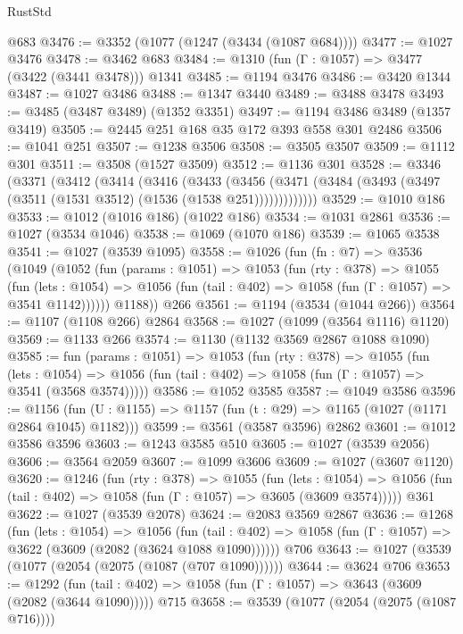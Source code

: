 \begin{lexlean}{RustStd}
\begin{coremodule}
    @683
@3476 := @3352 (@1077 (@1247 (@3434 (@1087 @684))))
@3477 := @1027 @3476
@3478 := @3462 @683
@3484 := @1310 (fun (Γ : @1057) => @3477 (@3422 (@3441 @3478))) @1341
@3485 := @1194 @3476
@3486 := @3420 @1344
@3487 := @1027 @3486
@3488 := @1347 @3440
@3489 := @3488 @3478
@3493 := @3485 (@3487 @3489) (@1352 @3351)
@3497 := @1194 @3486 @3489 (@1357 @3419)
@3505 := @2445 @251 @168 @35 @172 @393 @558 @301 @2486
@3506 := @1041 @251
@3507 := @1238 @3506
@3508 := @3505 @3507
@3509 := @1112 @301
@3511 := @3508 (@1527 @3509)
@3512 := @1136 @301
@3528 := @3346
    (@3371
      (@3412
        (@3414
          (@3416
            (@3433
              (@3456
                (@3471 (@3484 (@3493 (@3497 (@3511 (@1531 @3512) (@1536 (@1538 @251)))))))))))))
@3529 := @1010 @186
@3533 := @1012 (@1016 @186) (@1022 @186)
@3534 := @1031 @2861
@3536 := @1027 (@3534 @1046)
@3538 := @1069 (@1070 @186)
@3539 := @1065 @3538
@3541 := @1027 (@3539 @1095)
@3558 := @1026
    (fun (fn : @7) =>
    @3536
      (@1049
        (@1052
          (fun (params : @1051) =>
          @1053
            (fun (rty : @378) =>
            @1055
              (fun (lets : @1054) =>
              @1056 (fun (tail : @402) => @1058 (fun (Γ : @1057) => @3541 @1142))))))
        @1188))
    @266
@3561 := @1194 (@3534 (@1044 @266))
@3564 := @1107 (@1108 @266) @2864
@3568 := @1027 (@1099 (@3564 @1116) @1120)
@3569 := @1133 @266
@3574 := @1130 (@1132 @3569 @2867 @1088 @1090)
@3585 := fun (params : @1051) =>
  @1053
    (fun (rty : @378) =>
    @1055
      (fun (lets : @1054) =>
      @1056 (fun (tail : @402) => @1058 (fun (Γ : @1057) => @3541 (@3568 @3574)))))
@3586 := @1052 @3585
@3587 := @1049 @3586
@3596 := @1156 (fun (U : @1155) => @1157 (fun (t : @29) => @1165 (@1027 (@1171 @2864 @1045) @1182)))
@3599 := @3561 (@3587 @3596) @2862
@3601 := @1012 @3586 @3596
@3603 := @1243 @3585 @510
@3605 := @1027 (@3539 @2056)
@3606 := @3564 @2059
@3607 := @1099 @3606
@3609 := @1027 (@3607 @1120)
@3620 := @1246
    (fun (rty : @378) =>
    @1055
      (fun (lets : @1054) =>
      @1056 (fun (tail : @402) => @1058 (fun (Γ : @1057) => @3605 (@3609 @3574)))))
    @361
@3622 := @1027 (@3539 @2078)
@3624 := @2083 @3569 @2867
@3636 := @1268
    (fun (lets : @1054) =>
    @1056
      (fun (tail : @402) => @1058 (fun (Γ : @1057) => @3622 (@3609 (@2082 (@3624 @1088 @1090))))))
    @706
@3643 := @1027 (@3539 (@1077 (@2054 (@2075 (@1087 (@707 @1090))))))
@3644 := @3624 @706
@3653 := @1292
    (fun (tail : @402) => @1058 (fun (Γ : @1057) => @3643 (@3609 (@2082 (@3644 @1090)))))
    @715
@3658 := @3539 (@1077 (@2054 (@2075 (@1087 @716))))

\end{coremodule}
\end{lexlean}
